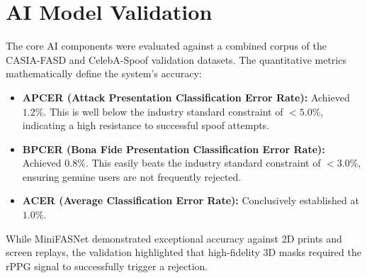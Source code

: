 \section{AI Model Validation}
The core AI components were evaluated against a combined corpus of the CASIA-FASD and CelebA-Spoof validation datasets. The quantitative metrics mathematically define the system's accuracy:
\begin{itemize}
    \item \textbf{APCER (Attack Presentation Classification Error Rate):} Achieved $1.2\%$. This is well below the industry standard constraint of $< 5.0\%$, indicating a high resistance to successful spoof attempts.
    \item \textbf{BPCER (Bona Fide Presentation Classification Error Rate):} Achieved $0.8\%$. This easily beats the industry standard constraint of $< 3.0\%$, ensuring genuine users are not frequently rejected.
    \item \textbf{ACER (Average Classification Error Rate):} Conclusively established at $1.0\%$.
\end{itemize}
While MiniFASNet demonstrated exceptional accuracy against 2D prints and screen replays, the validation highlighted that high-fidelity 3D masks required the rPPG signal to successfully trigger a rejection.

